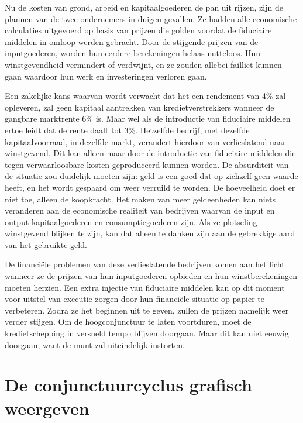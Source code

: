 Nu de kosten van grond, arbeid en kapitaalgoederen de pan uit rijzen, zijn de plannen van de twee ondernemers in duigen gevallen. Ze hadden alle economische calculaties uitgevoerd op basis van prijzen die golden voordat de fiduciaire middelen in omloop werden gebracht. Door de stijgende prijzen van de inputgoederen, worden hun eerdere berekeningen helaas nutteloos. Hun winstgevendheid vermindert of verdwijnt, en ze zouden allebei failliet kunnen gaan waardoor hun werk en investeringen verloren gaan.

Een zakelijke kans waarvan wordt verwacht dat het een rendement van 4\% zal opleveren, zal geen kapitaal aantrekken van kredietverstrekkers wanneer de gangbare marktrente 6\% is. Maar wel als de introductie van fiduciaire middelen ertoe leidt dat de rente daalt tot 3\%. Hetzelfde bedrijf, met dezelfde kapitaalvoorraad, in dezelfde markt, verandert hierdoor van verlieslatend naar winstgevend. Dit kan alleen maar door de introductie van fiduciaire middelen die tegen verwaarloosbare kosten geproduceerd kunnen worden. De absurditeit van de situatie zou duidelijk moeten zijn: geld is een goed dat op zichzelf geen waarde heeft, en het wordt gespaard om weer verruild te worden. De hoeveelheid doet er niet toe, alleen de koopkracht. Het maken van meer geldeenheden kan niets veranderen aan de economische realiteit van bedrijven waarvan de input en output kapitaalgoederen en consumptiegoederen zijn. Als ze plotseling winstgevend blijken te zijn, kan dat alleen te danken zijn aan de gebrekkige aard van het gebruikte geld.

De financiële problemen van deze verlieslatende bedrijven komen aan het licht wanneer ze de prijzen van hun inputgoederen opbieden en hun winstberekeningen moeten herzien. Een extra injectie van fiduciaire middelen kan op dit moment voor uitstel van executie zorgen door hun financiële situatie op papier te verbeteren. Zodra ze het beginnen uit te geven, zullen de prijzen namelijk weer verder stijgen. Om de hoogconjunctuur te laten voortduren, moet de kredietschepping in versneld tempo blijven doorgaan. Maar dit kan niet eeuwig doorgaan, want de munt zal uiteindelijk instorten.

\hypertarget{de-conjunctuurcyclus-grafisch-weergeven}{%
\section{De conjunctuurcyclus grafisch weergeven}\label{de-conjunctuurcyclus-grafisch-weergeven}}

